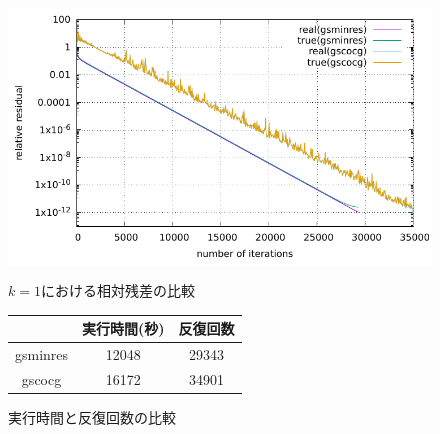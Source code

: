 

\begin{figure}[H]
	\begin{center}
		\begin{minipage}[]{0.49\columnwidth}
			\centering
			\colorbox{white}{ \includegraphics[scale=1.5]{./fig/compare-residual.pdf} }
			\caption{$k=1$における相対残差の比較}
			\label{fig-compare-residual}
		\end{minipage}
		\begin{minipage}[]{0.49\columnwidth}
			\centering
			\makeatletter
			\def\@captype{table}
			\makeatother
			\caption{実行時間と反復回数の比較}
			\label{table-compare-time-itrs}
			\begin{tabular}{ccc}
				\hline
						& 実行時間(秒)	& 反復回数	\\ \hline
				gsminres	& 12048		& 29343	\\
				gscocg	& 16172		& 34901	\\
				\hline
			\end{tabular}
		\end{minipage}
	\end{center}
\end{figure}

